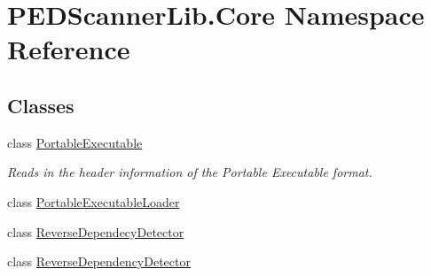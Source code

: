\hypertarget{namespace_p_e_d_scanner_lib_1_1_core}{}\section{P\+E\+D\+Scanner\+Lib.\+Core Namespace Reference}
\label{namespace_p_e_d_scanner_lib_1_1_core}
\subsection*{Classes}
\begin{DoxyCompactItemize}
\item 
class \mbox{\hyperlink{class_p_e_d_scanner_lib_1_1_core_1_1_portable_executable}{Portable\+Executable}}
\begin{DoxyCompactList}\small\item\em Reads in the header information of the Portable Executable format. \end{DoxyCompactList}\item 
class \mbox{\hyperlink{class_p_e_d_scanner_lib_1_1_core_1_1_portable_executable_loader}{Portable\+Executable\+Loader}}
\item 
class \mbox{\hyperlink{class_p_e_d_scanner_lib_1_1_core_1_1_reverse_dependecy_detector}{Reverse\+Dependecy\+Detector}}
\item 
class \mbox{\hyperlink{class_p_e_d_scanner_lib_1_1_core_1_1_reverse_dependency_detector}{Reverse\+Dependency\+Detector}}
\end{DoxyCompactItemize}
